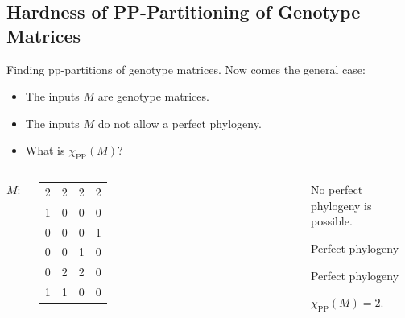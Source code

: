 \documentclass[aspectratio=1610]{beamer}
\begin{document}
\subsection{Hardness of PP-Partitioning of Genotype Matrices}


\begin{frame}{Finding pp-partitions of genotype matrices.}
  Now comes the general case:
  \begin{itemize}
  \item The inputs $M$ are \alert{genotype matrices}.
  \item The inputs $M$ \alert{do not allow a perfect phylogeny}.
  \item What is $\chi_{\operatorname{PP}}(M)$?
  \end{itemize}
  \begin{example}
    \begin{columns}
      $M\colon$
      \footnotesize
      \begin{tabular}{cccc}
        2 & 2 & 2 & 2 \\
        1 & 0 & 0 & 0 \\
        0 & 0 & 0 & 1 \\
        0 & 0 & 1 & 0 \\
        0 & 2 & 2 & 0 \\
        1 & 1 & 0 & 0 
      \end{tabular}%
      {%
      }
      \begin{overprint}
        No perfect phylogeny is possible.
        
        \textcolor{blue!70!bg}{Perfect phylogeny}
        
        \textcolor{red!70!bg}{Perfect phylogeny}
        
        $\chi_{\operatorname{PP}}(M) = 2$.
        
      \end{overprint}
    \end{columns}
  \end{example}
\end{frame}
\end{document}
